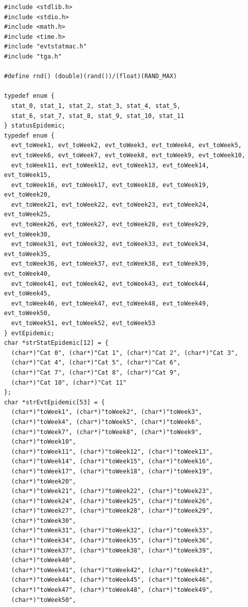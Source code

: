 \documentclass[12pt, a4paper]{article}
\begin{document}
\begin{scriptsize}
\begin{ttfamily}
\begin{lstlisting}
#include <stdlib.h>
#include <stdio.h>
#include <math.h>
#include <time.h>
#include "evtstatmac.h"
#include "tga.h"

#define rnd() (double)(rand())/(float)(RAND_MAX)
 
typedef enum {
  stat_0, stat_1, stat_2, stat_3, stat_4, stat_5, 
  stat_6, stat_7, stat_8, stat_9, stat_10, stat_11
} statusEpidemic;
typedef enum {
  evt_toWeek1, evt_toWeek2, evt_toWeek3, evt_toWeek4, evt_toWeek5,
  evt_toWeek6, evt_toWeek7, evt_toWeek8, evt_toWeek9, evt_toWeek10,
  evt_toWeek11, evt_toWeek12, evt_toWeek13, evt_toWeek14, evt_toWeek15,
  evt_toWeek16, evt_toWeek17, evt_toWeek18, evt_toWeek19, evt_toWeek20,
  evt_toWeek21, evt_toWeek22, evt_toWeek23, evt_toWeek24, evt_toWeek25,
  evt_toWeek26, evt_toWeek27, evt_toWeek28, evt_toWeek29, evt_toWeek30,
  evt_toWeek31, evt_toWeek32, evt_toWeek33, evt_toWeek34, evt_toWeek35,
  evt_toWeek36, evt_toWeek37, evt_toWeek38, evt_toWeek39, evt_toWeek40,
  evt_toWeek41, evt_toWeek42, evt_toWeek43, evt_toWeek44, evt_toWeek45,
  evt_toWeek46, evt_toWeek47, evt_toWeek48, evt_toWeek49, evt_toWeek50,
  evt_toWeek51, evt_toWeek52, evt_toWeek53
} evtEpidemic;
char *strStatEpidemic[12] = {
  (char*)"Cat 0", (char*)"Cat 1", (char*)"Cat 2", (char*)"Cat 3", 
  (char*)"Cat 4", (char*)"Cat 5", (char*)"Cat 6", 
  (char*)"Cat 7", (char*)"Cat 8", (char*)"Cat 9", 
  (char*)"Cat 10", (char*)"Cat 11"
};
char *strEvtEpidemic[53] = {
  (char*)"toWeek1", (char*)"toWeek2", (char*)"toWeek3", 
  (char*)"toWeek4", (char*)"toWeek5", (char*)"toWeek6", 
  (char*)"toWeek7", (char*)"toWeek8", (char*)"toWeek9", 
  (char*)"toWeek10", 
  (char*)"toWeek11", (char*)"toWeek12", (char*)"toWeek13", 
  (char*)"toWeek14", (char*)"toWeek15", (char*)"toWeek16",
  (char*)"toWeek17", (char*)"toWeek18", (char*)"toWeek19", 
  (char*)"toWeek20", 
  (char*)"toWeek21", (char*)"toWeek22", (char*)"toWeek23", 
  (char*)"toWeek24", (char*)"toWeek25", (char*)"toWeek26",
  (char*)"toWeek27", (char*)"toWeek28", (char*)"toWeek29", 
  (char*)"toWeek30", 
  (char*)"toWeek31", (char*)"toWeek32", (char*)"toWeek33", 
  (char*)"toWeek34", (char*)"toWeek35", (char*)"toWeek36", 
  (char*)"toWeek37", (char*)"toWeek38", (char*)"toWeek39", 
  (char*)"toWeek40", 
  (char*)"toWeek41", (char*)"toWeek42", (char*)"toWeek43", 
  (char*)"toWeek44", (char*)"toWeek45", (char*)"toWeek46", 
  (char*)"toWeek47", (char*)"toWeek48", (char*)"toWeek49", 
  (char*)"toWeek50", 

\end{lstlisting}
\end{ttfamily}
\end{scriptsize}
\end{document}
